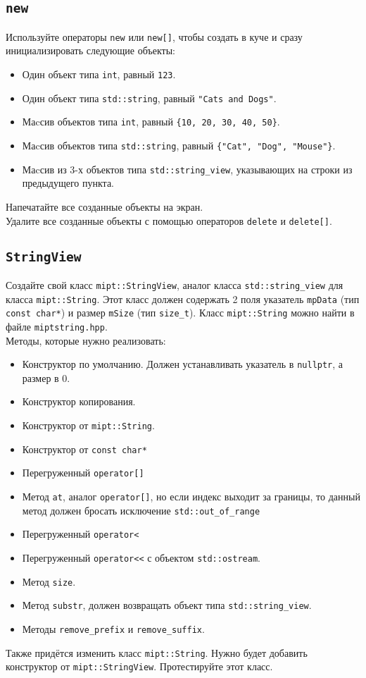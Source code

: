 \documentclass{article}
\begin{document}
\subsection{\texttt{new}}
Используйте операторы \texttt{new} или \texttt{new[]}, чтобы создать в куче и сразу инициализировать следующие объекты:
\begin{itemize}
\item Один объект типа \texttt{int}, равный \texttt{123}.
\item Один объект типа \texttt{std::string}, равный \texttt{"Cats and Dogs"}.
\item Маcсив объектов типа \texttt{int}, равный \texttt{\{10, 20, 30, 40, 50\}}.
\item Маcсив объектов типа \texttt{std::string}, равный \texttt{\{"Cat"{}, "Dog"{}, "Mouse"\}}.
\item Маcсив из 3-х объектов типа \texttt{std::string\_view}, указывающих на строки из предыдущего пункта.
\end{itemize}
Напечатайте все созданные объекты на экран.\\
Удалите все созданные объекты с помощью операторов \texttt{delete} и \texttt{delete[]}.


\subsection{\texttt{StringView}}
Создайте свой класс \texttt{mipt::StringView}, аналог класса \texttt{std::string\_view} для класса \texttt{mipt::String}.
Этот класс должен содержать 2 поля указатель \texttt{mpData} (тип \texttt{const char*}) и размер \texttt{mSize} (тип \texttt{size\_t}). Класс \texttt{mipt::String} можно найти в файле \texttt{miptstring.hpp}.\\

Методы, которые нужно реализовать:
\begin{itemize}
\item Конструктор по умолчанию. Должен устанавливать указатель в \texttt{nullptr}, а размер в 0.
\item Конструктор копирования.
\item Конструктор от \texttt{mipt::String}.
\item Конструктор от \texttt{const char*}
\item Перегруженный \texttt{operator[]}
\item Метод \texttt{at}, аналог \texttt{operator[]}, но если индекс выходит за границы, то данный метод должен бросать исключение \texttt{std::out\_of\_range}
\item Перегруженный \texttt{operator<}
\item Перегруженный \texttt{operator<{}<} с объектом \texttt{std::ostream}.
\item Метод \texttt{size}.
\item Метод \texttt{substr}, должен возвращать объект типа \texttt{std::string\_view}.
\item Методы \texttt{remove\_prefix} и \texttt{remove\_suffix}.
\end{itemize}

Также придётся изменить класс \texttt{mipt::String}. Нужно будет добавить конструктор от \texttt{mipt::StringView}.
Протестируйте этот класс.
\end{document}
